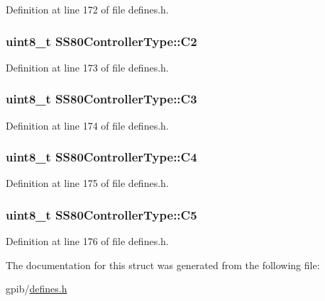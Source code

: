 Definition at line 172 of file defines.\+h.

\subsubsection[{\texorpdfstring{C2}{C2}}]{\setlength{\rightskip}{0pt plus 5cm}uint8\+\_\+t S\+S80\+Controller\+Type\+::\+C2}\hypertarget{structSS80ControllerType_a99a2d4b94a756273b7ad2e4bdc786de8}{}\label{structSS80ControllerType_a99a2d4b94a756273b7ad2e4bdc786de8}


Definition at line 173 of file defines.\+h.

\subsubsection[{\texorpdfstring{C3}{C3}}]{\setlength{\rightskip}{0pt plus 5cm}uint8\+\_\+t S\+S80\+Controller\+Type\+::\+C3}\hypertarget{structSS80ControllerType_acdbaaa95ad03c2a60f9e5cb0f9558ff8}{}\label{structSS80ControllerType_acdbaaa95ad03c2a60f9e5cb0f9558ff8}


Definition at line 174 of file defines.\+h.

\subsubsection[{\texorpdfstring{C4}{C4}}]{\setlength{\rightskip}{0pt plus 5cm}uint8\+\_\+t S\+S80\+Controller\+Type\+::\+C4}\hypertarget{structSS80ControllerType_a1d3d0ce7719f1fcb2d4c8c0c70750cdf}{}\label{structSS80ControllerType_a1d3d0ce7719f1fcb2d4c8c0c70750cdf}


Definition at line 175 of file defines.\+h.

\subsubsection[{\texorpdfstring{C5}{C5}}]{\setlength{\rightskip}{0pt plus 5cm}uint8\+\_\+t S\+S80\+Controller\+Type\+::\+C5}\hypertarget{structSS80ControllerType_ae968d050e8c1a5b20a607dd16b4322c8}{}\label{structSS80ControllerType_ae968d050e8c1a5b20a607dd16b4322c8}


Definition at line 176 of file defines.\+h.



The documentation for this struct was generated from the following file\+:\begin{DoxyCompactItemize}
\item 
gpib/\hyperlink{defines_8h}{defines.\+h}\end{DoxyCompactItemize}
